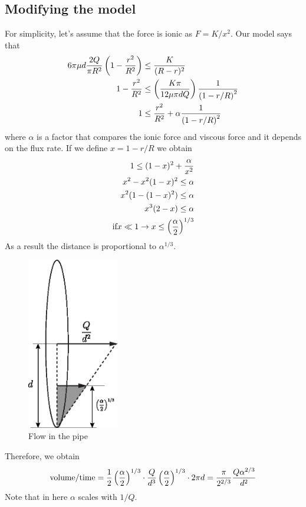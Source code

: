 \subsection{Modifying the model}
%
For simplicity, let's assume that the force is ionic as $F= K/x^2$. Our model says that
%
\begin{align}
    6\pi \mu d \frac{2Q}{\pi R^2} \left( 1- \frac{r^2}{R^2} \right) & \leq \frac{K}{(R-r)^2} \\
    1 - \frac{r^2}{R^2} & \leq \left( \frac{K \pi }{12 \mu \pi d Q} \right) \frac{1}{\left( 1 - r/R \right)^2} \\
    1 & \leq \frac{r^2}{R^2} + \alpha \frac{1}{\left( 1-r/R\right) ^2}
\end{align}
%
where $\alpha$ is a factor that compares the ionic force and viscous force and it depends on the flux rate. If we define $x = 1- r/R$ we obtain
%
\begin{align}
    1 \leq (1-x)^2 + \frac{\alpha}{x^2} \\
    x^2- x^2(1-x)^2 \leq \alpha \\
    x^2 (1- (1-x)^2) \leq \alpha \\
    x^3(2-x) \leq \alpha \\
    \text{if} x\ll1 \to x\leq \left( \frac{\alpha}{2}\right)^{1/3}
\end{align}
%
As a result the distance is proportional to $\alpha^{1/3}$. 
%
\begin{figure}[h]
  \centering
  \includegraphics[width=4cm]{./Figs/model2.eps}
  \caption{Flow in the pipe}
\end{figure}
%
Therefore, we obtain
%
\begin{align}
    \text{volume}/\text{time} = \frac{1}{2} \left( \frac{\alpha}{2}\right)^{1/3} \cdot  \frac{Q}{d^3}\left( \frac{\alpha}{2}\right)^{1/3} \cdot 2 \pi d = \frac{\pi}{2^{2/3}} \frac{Q \alpha^{2/3}}{d^2}
\end{align}
%
Note that in here $\alpha$ scales with $1/Q$. 







